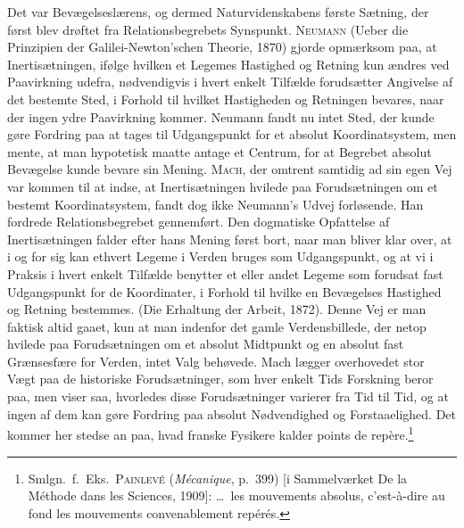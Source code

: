 \documentclass[12pt]{article}
\newcommand{\opage}[1]{\marginnote{\footnotesize\textit{[#1]}}}
\begin{document}
Det var Bevægelseslærens, og dermed Naturvidenskabens første Sætning,
der først blev drøftet fra Relationsbegrebets Synspunkt. \textsc{Neumann}
(Ueber die Prinzipien der Galilei-Newton'schen Theorie, 1870) gjorde
opmærksom paa, at Inertisætningen, ifølge hvilken et Legemes Hastighed og
Retning kun ændres ved Paavirkning udefra, nødvendigvis i hvert enkelt
Tilfælde forudsætter Angivelse af det bestemte Sted, i Forhold til hvilket
Hastigheden og Retningen bevares, naar der ingen ydre Paavirkning kommer.
Neumann fandt nu intet Sted, der kunde gøre Fordring paa at tages til
Udgangspunkt for et absolut Koordinatsystem, men mente, at man hypotetisk
maatte antage et Centrum, for at Begrebet absolut Bevægelse kunde bevare
sin Mening. \textsc{Mach}, der omtrent samtidig ad sin egen Vej var
kommen til at indse, at Inertisætningen hvilede paa Forudsætningen om et
bestemt Koordinatsystem, fandt dog ikke Neumann's Udvej forløsende. Han
fordrede Relationsbegrebet gennemført. Den dogmatiske Opfattelse af
Inertisætningen falder efter hans Mening først bort, naar man bliver klar
over, at i og for sig kan ethvert Legeme i Verden bruges som Udgangspunkt,
og at vi i Praksis i hvert
\opage{73} \setcounter{footnote}{0}%
enkelt Tilfælde benytter et eller andet Legeme som forudsat fast
Udgangspunkt for de Koordinater, i Forhold til hvilke en Bevægelses
Hastighed og Retning bestemmes. (Die Erhaltung der Arbeit, 1872). Denne
Vej er man faktisk altid gaaet, kun at man indenfor
det gamle Verdensbillede, der netop hvilede paa Forudsætningen om et
absolut Midtpunkt og en absolut fast Grænsesfære for Verden, intet Valg
behøvede. Mach lægger overhovedet stor Vægt paa de historiske
Forudsætninger, som hver enkelt Tids Forskning beror paa, men viser saa,
hvorledes disse Forudsætninger varierer fra Tid til Tid, og at ingen af
dem kan gøre Fordring paa absolut Nødvendighed og Forstaaelighed. Det
kommer her stedse an paa, hvad franske Fysikere kalder
points de repère.\footnote{Smlgn.\ f.\ Eks.\ \textsc{Painlevé}
  (\textit{Mécanique}, p.~399) [i Sammelværket \guillemotright De la Méthode
  dans les Sciences\guillemotleft , 1909]: \guillemotright\ldots\ les
  mouvements absolus, c'est-à-dire au fond les mouvements convenablement
  repérés.\guillemotleft}
\end{document}
